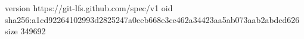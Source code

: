version https://git-lfs.github.com/spec/v1
oid sha256:a1cd92264102993d2825247a0ceb668e3ce462a34423aa5ab073aab2abdcd626
size 349692
